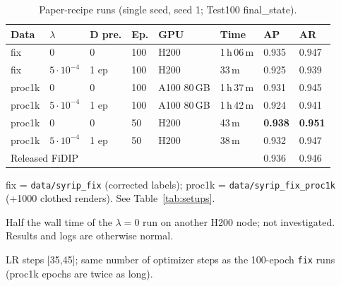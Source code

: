\documentclass[10pt]{article}
\begin{document}
\begin{table}[h]\centering\small
\begin{threeparttable}
\caption{Paper-recipe runs (single seed, seed 1; Test100 final\_state).}
\label{tab:paper}
\begin{tabularx}{\linewidth}{l l l l X l l l}
\toprule
Data\tnote{a} & $\lambda$ & D pre. & Ep. & GPU & Time & AP & AR \\
\midrule
fix & 0 & 0 & 100 & H200 & 1\,h\,06\,m & 0.935 & 0.947 \\
fix & $5\cdot10^{-4}$ & 1 ep & 100 & H200 & 33\,m\tnote{b} & 0.925 & 0.939 \\
\midrule
proc1k & 0 & 0 & 100 & A100 80\,GB & 1\,h\,37\,m & 0.931 & 0.945 \\
proc1k & $5\cdot10^{-4}$ & 1 ep & 100 & A100 80\,GB & 1\,h\,42\,m & 0.924 & 0.941 \\
\midrule
proc1k & 0 & 0 & 50\tnote{c} & H200 & 43\,m & \textbf{0.938} & \textbf{0.951} \\
proc1k & $5\cdot10^{-4}$ & 1 ep & 50\tnote{c} & H200 & 38\,m & 0.932 & 0.947 \\
\midrule
\multicolumn{6}{l}{Released FiDIP} & 0.936 & 0.946 \\
\bottomrule
\end{tabularx}
\begin{tablenotes}\footnotesize
\item[a] fix = \texttt{data/syrip\_fix} (corrected labels); proc1k = \texttt{data/syrip\_fix\_proc1k} (+1000 clothed renders). See Table~\ref{tab:setups}.
\item[b] Half the wall time of the $\lambda=0$ run on another H200 node; not investigated. Results and logs are otherwise normal.
\item[c] LR steps [35,45]; same number of optimizer steps as the 100-epoch \texttt{fix} runs (proc1k epochs are twice as long).
\end{tablenotes}
\end{threeparttable}
\end{table}
\end{document}
